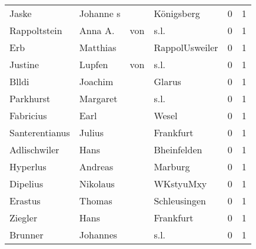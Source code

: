 \begin{tabular}{llllrr}
                    Jaske &                          Johanne s &             &                                  Königsberg &          0 &         1 \\
             Rappoltstein &                            Anna A. &         von &                                        s.l. &          0 &         1 \\
                      Erb &                           Matthias &             &                              RappolUsweiler &          0 &         1 \\
                  Justine &                             Lupfen &         von &                                        s.l. &          0 &         1 \\
                    Blldi &                            Joachim &             &                                      Glarus &          0 &         1 \\
                Parkhurst &                           Margaret &             &                                        s.l. &          0 &         1 \\
                Fabricius &                               Earl &             &                                       Wesel &          0 &         1 \\
           Santerentianus &                             Julius &             &                                   Frankfurt &          0 &         1 \\
             Adlischwiler &                               Hans &             &                                 Bheinfelden &          0 &         1 \\
                 Hyperlus &                            Andreas &             &                                     Marburg &          0 &         1 \\
                 Dipelius &                           Nikolaus &             &                                   WKstyuMxy &          0 &         1 \\
                  Erastus &                             Thomas &             &                                Schleusingen &          0 &         1 \\
                  Ziegler &                               Hans &             &                                   Frankfurt &          0 &         1 \\
                  Brunner &                           Johannes &             &                                        s.l. &          0 &         1 \\

\end{tabular}
